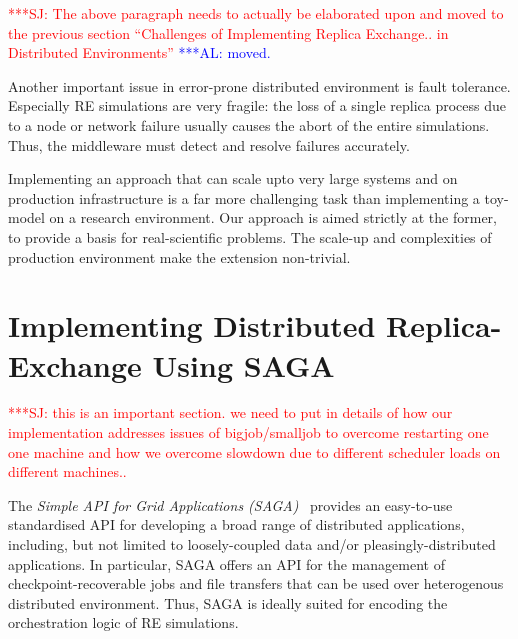 \documentclass{rspublic}
\newcommand{\alnote}[1]{ {\textcolor{blue} { ***AL: #1 }}}
\newcommand{\jhanote}[1]{ {\textcolor{red} { ***SJ: #1 }}}
\newcommand{\alnote}[1]{}
\newcommand{\jhanote}[1]{}
\begin{document}
\jhanote{The above paragraph needs to actually be elaborated upon and
  moved to the previous section ``Challenges of Implementing Replica
  Exchange.. in Distributed Environments''}
\alnote{moved.}

                 
Another important issue in error-prone distributed environment is
fault tolerance.  Especially RE simulations are very fragile: the
loss of a single replica process due to a node or network failure
usually causes the abort of the entire simulations. Thus, the
middleware must detect and resolve failures accurately.
                                  
Implementing an approach that can scale upto very large systems and on
production infrastructure is a far more challenging task than
implementing a toy-model on a research environment. Our approach is
aimed strictly at the former, to provide a basis for real-scientific
problems. The scale-up and complexities of production environment make
the extension non-trivial.


\section{Implementing Distributed Replica-Exchange Using SAGA}

\jhanote{this is an important section. we need to put in details of
  how our implementation addresses issues of bigjob/smalljob to
  overcome restarting one one machine and how we overcome slowdown due
  to different scheduler loads on different machines..}

The \emph{Simple API for Grid Applications (SAGA)}~\citep{saga_gfd90}
provides an easy-to-use standardised API for developing a broad range
of distributed applications, including, but not limited to
loosely-coupled data and/or pleasingly-distributed applications.  
In particular, SAGA offers an API for the management of
checkpoint-recoverable jobs and file transfers that can be used over
heterogenous distributed environment. Thus, SAGA is ideally suited for
encoding the orchestration logic of RE simulations.
\end{document}
